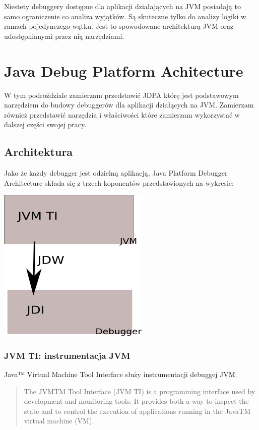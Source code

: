Niestety debuggery dostępne dla aplikacji działających na JVM posiadają to samo ograniczenie co   analiza wyjątków. Są skuteczne tylko do analizy logiki w ramach pojedynczego wątku. Jest to spowodowane architekturą JVM oraz udostępnianymi przez nią narzędziami.


\section{Java Debug Platform Achitecture}

W tym podroździale zamierzam przedstawić JDPA którę jest podstawowym narzędziem do budowy debuggerów dla aplikacji działących na JVM. Zamierzam również przedstawić narzędzia i właściwości które zamierzam wykorzystać w dalszej części swojej pracy.

\subsection{Architektura}

Jako że każdy debugger jest odzielną aplikacją, Java Platform Debugger Architecture składa się z trzech koponentów przedstawionych na wykresie:

\includegraphics{imgs/jdpa}

\subsubsection{JVM TI: instrumentacja JVM} 

Java™ Virtual Machine Tool Interface służy instrumentacji debuggej JVM.

\begin{quote}
The JVMTM Tool Interface (JVM TI) is a programming interface used by development and monitoring tools. It provides both a way to inspect the state and to control the execution of applications running in the JavaTM virtual machine (VM). \cite{jvmtiSpec}
\end{quote}

